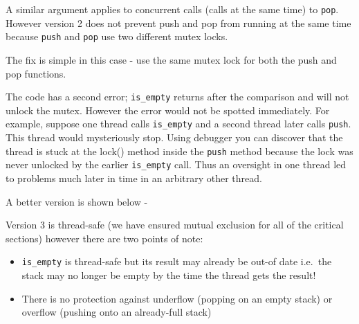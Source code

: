 A similar argument applies to concurrent calls (calls at the same time)
to \texttt{pop}. However version 2 does not prevent push and pop from
running at the same time because \texttt{push} and \texttt{pop} use two
different mutex locks.

The fix is simple in this case - use the same mutex lock for both the
push and pop functions.

The code has a second error; \texttt{is\_empty} returns after the
comparison and will not unlock the mutex. However the error would not be
spotted immediately. For example, suppose one thread calls
\texttt{is\_empty} and a second thread later calls \texttt{push}. This
thread would mysteriously stop. Using debugger you can discover that the
thread is stuck at the lock() method inside the \texttt{push} method
because the lock was never unlocked by the earlier \texttt{is\_empty}
call. Thus an oversight in one thread led to problems much later in time
in an arbitrary other thread.

A better version is shown below -

\begin{Shaded}
\begin{Highlighting}[]
 
 

  
\NormalTok{\}}
 
   
   
\NormalTok{\}}
 
   \NormalTok{;}
   
\NormalTok{\}}
\end{Highlighting}
\end{Shaded}

Version 3 is thread-safe (we have ensured mutual exclusion for all of
the critical sections) however there are two points of note:

\begin{itemize}
\itemsep1pt\parskip0pt
\item
  \texttt{is\_empty} is thread-safe but its result may already be out-of
  date i.e.~the stack may no longer be empty by the time the thread gets
  the result!
\item
  There is no protection against underflow (popping on an empty stack)
  or overflow (pushing onto an already-full stack)
\end{itemize}

